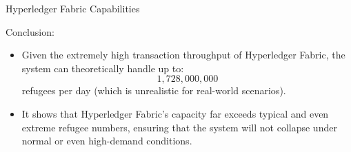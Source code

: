 \documentclass{beamer}
\begin{document}
\begin{frame}{Hyperledger Fabric Capabilities}
\begin{table}[h!]
\label{estimation3}
\end{table}
\alert{Conclusion}: 
\begin{itemize}
\item Given the extremely high transaction throughput of Hyperledger Fabric, the system can theoretically handle up to: \[ 1,728,000,000 \] refugees per day (which is unrealistic for real-world scenarios). 
\item It shows that Hyperledger Fabric's capacity far exceeds typical and even extreme refugee numbers, ensuring that the system will not collapse under normal or even high-demand conditions.
\end{itemize}
\end{frame}
\end{document}
